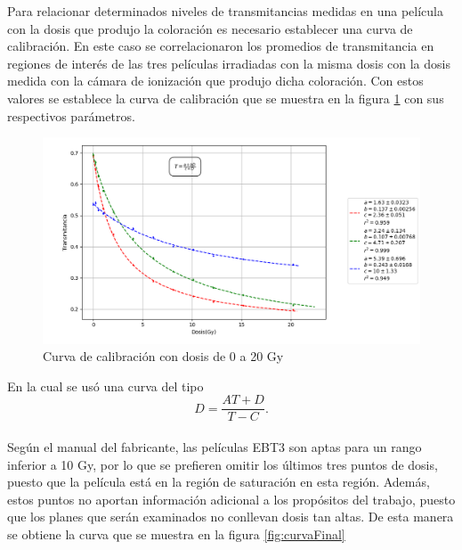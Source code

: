 Para relacionar determinados niveles de transmitancias medidas en una película con la dosis que produjo la coloración es necesario establecer una curva de calibración. En este caso se correlacionaron los promedios de transmitancia en regiones de interés de las tres películas irradiadas con la misma dosis con la dosis medida con la cámara de ionización que produjo dicha coloración. Con estos valores se establece la curva de calibración que se muestra en la figura \ref{fig:curvaFinal20} con sus respectivos parámetros.\\


\begin{figure}[H]
	\centering
\includegraphics[width=\linewidth]{images/calibracionMulti0a20.png}
	
	\caption{Curva de calibración con dosis de 0 a 20 Gy }
	\label{fig:curvaFinal20}
\end{figure}

En la cual se usó una curva del tipo 
\begin{equation}
D=\frac{AT+D}{T-C}.
\end{equation}\\

Según el manual del fabricante, las películas EBT3 son aptas para un rango inferior a 10 Gy, por lo que se prefieren omitir los últimos tres puntos de dosis, puesto que la película está en la región de saturación en esta región.  Además, estos puntos no aportan información adicional a los propósitos del trabajo, puesto que los planes que serán examinados no conllevan dosis tan altas. De esta manera se obtiene la curva que se muestra en la figura \ref{fig:curvaFinal}\\

